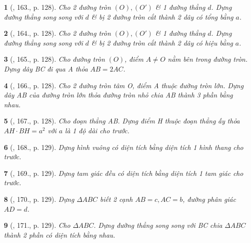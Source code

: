 \documentclass{article}
\newtheorem{baitoan}{}
\begin{document}
\begin{baitoan}[\cite{Binh_Toan_9_tap_1}, 163., p. 128]
	Cho 2 đường tròn $(O),(O')$ \& 1 đường thẳng $d$. Dựng đường thẳng song song với $d$ \& bị 2 đường tròn cắt thành 2 dây có tổng bằng $a$.
\end{baitoan}

\begin{baitoan}[\cite{Binh_Toan_9_tap_1}, 164., p. 128]
	Cho 2 đường tròn $(O),(O')$ \& 1 đường thẳng $d$. Dựng đường thẳng song song với $d$ \& bị 2 đường tròn cắt thành 2 dây có hiệu bằng $a$.
\end{baitoan}

\begin{baitoan}[\cite{Binh_Toan_9_tap_1}, 165., p. 128]
	Cho đường tròn $(O)$, điểm $A\ne O$ nằm bên trong đường tròn. Dựng dây BC đi qua A thỏa $AB = 2AC$.
\end{baitoan}

\begin{baitoan}[\cite{Binh_Toan_9_tap_1}, 166., p. 128]
	Cho 2 đường tròn tâm O, điểm A thuộc đường tròn lớn. Dựng dây AB của đường tròn lớn thỏa đường tròn nhỏ chia AB thành 3 phần bằng nhau.
\end{baitoan}

\begin{baitoan}[\cite{Binh_Toan_9_tap_1}, 167., p. 128]
	Cho đoạn thẳng AB. Dựng điểm H thuộc đoạn thẳng ấy thỏa $AH\cdot BH = a^2$ với $a$ là 1 độ dài cho trước.
\end{baitoan}

\begin{baitoan}[\cite{Binh_Toan_9_tap_1}, 168., p. 129]
	Dựng hình vuông có diện tích bằng diện tích 1 hình thang cho trước.
\end{baitoan}

\begin{baitoan}[\cite{Binh_Toan_9_tap_1}, 169., p. 129]
	Dựng tam giác đều có diện tích bằng diện tích 1 tam giác cho trước.
\end{baitoan}

\begin{baitoan}[\cite{Binh_Toan_9_tap_1}, 170., p. 129]
	Dựng $\Delta ABC$ biết 2 cạnh $AB = c,AC = b$, đường phân giác $AD = d$.
\end{baitoan}

\begin{baitoan}[\cite{Binh_Toan_9_tap_1}, 171., p. 129]
	Cho $\Delta ABC$. Dựng đường thẳng song song với BC chia $\Delta ABC$ thành 2 phần có diện tích bằng nhau.
\end{baitoan}
\end{document}
